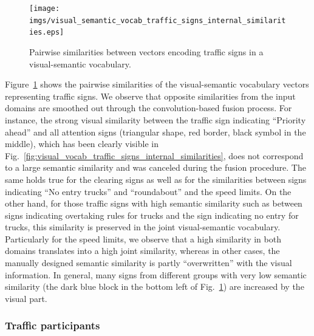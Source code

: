\begin{figure}[t]
    \centering
    \texttt{[image: imgs/visual\_semantic\_vocab\_traffic\_signs\_internal\_similarities.eps]}
    \caption{Pairwise similarities between vectors encoding traffic signs in a visual-semantic vocabulary.}
    \label{fig:visual_semantic_vocab_traffic_signs_internal_similarities}
\end{figure}

Figure~\ref{fig:visual_semantic_vocab_traffic_signs_internal_similarities} shows the pairwise similarities of the visual-semantic vocabulary vectors representing traffic signs.
We observe that opposite similarities from the input domains are smoothed out through the convolution-based fusion process.
For instance, the strong visual similarity between the traffic sign indicating \enquote{Priority ahead} and all attention signs (triangular shape, red border, black symbol in the middle), which has been clearly visible in Fig.~\ref{fig:visual_vocab_traffic_signs_internal_similarities}, does not correspond to a large semantic similarity and was canceled during the fusion procedure.
The same holds true for the clearing signs as well as for the similarities between signs indicating \enquote{No entry trucks} and \enquote{roundabout} and the speed limits.
On the other hand, for those traffic signs with high semantic similarity such as between signs indicating overtaking rules for trucks and the sign indicating no entry for trucks, this similarity is preserved in the joint visual-semantic vocabulary. 
Particularly for the speed limits, we observe that a high similarity in both domains translates into a high joint similarity, whereas in other cases, the manually designed semantic similarity is partly \enquote{overwritten} with the visual information.
In general, many signs from different groups with very low semantic similarity (the dark blue block in the bottom left of Fig.~\ref{fig:visual_semantic_vocab_traffic_signs_internal_similarities}) are increased by the visual part. 

\subsubsection{Traffic participants}%
\label{ssubsec:traffic_participants}

